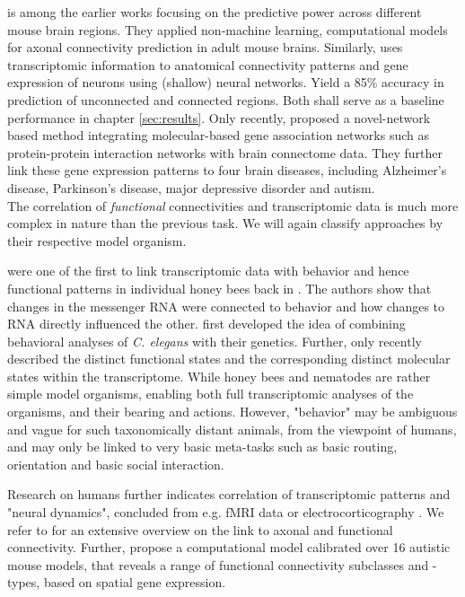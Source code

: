 \documentclass[]{article}
\renewcommand{\cite}{\citep}
\begin{document}
\citet{fakhry2015high} is among the earlier works focusing on the predictive power across different mouse brain regions. They applied non-machine learning, computational models for axonal connectivity prediction in adult mouse brains. Similarly, \citet{roberti2019exploiting} uses transcriptomic information to anatomical connectivity patterns and gene expression of neurons using (shallow) neural networks. Yield a 85\% accuracy in prediction of unconnected and connected regions. Both shall serve as a baseline performance in chapter \ref{sec:results}. 
Only recently, \citet{wang2022network} proposed a novel-network based method integrating molecular-based gene association networks such as protein-protein interaction networks with brain connectome data. They further link these gene expression patterns to four brain diseases, including Alzheimer’s disease, Parkinson’s disease, major depressive disorder and autism.
\\

The correlation of \textit{functional} connectivities and transcriptomic data is much more complex in nature than the previous task. We will again classify approaches by their respective model organism.

\citet{whitfield2003gene} were one of the first to link transcriptomic data with behavior and hence functional patterns in individual honey bees back in \citeyear{whitfield2003gene}. The authors show that changes in the messenger RNA were connected to behavior and how changes to RNA directly influenced the other.
\citet{rankin2002gene} first developed the idea of combining behavioral analyses of \textit{C. elegans} with their genetics. Further, \citet{sun2021temporal} only recently described the distinct functional states and the corresponding distinct molecular states within the transcriptome. While honey bees and nematodes are rather simple model organisms, enabling both full transcriptomic analyses of the organisms, and their bearing and actions. However, "behavior" may be ambiguous and vague for such taxonomically distant animals, from the viewpoint of humans, and may only be linked to very basic meta-tasks such as basic routing, orientation and basic social interaction. 

Research on humans further indicates correlation of transcriptomic patterns and "neural dynamics", concluded from e.g. fMRI data \cite{richiardi2015correlated, diez2018neurogenetic, vertes2016gene} or electrocorticography \cite{betzel2019structural}. We refer to \citet{fulcher2021overcoming} for an extensive overview on the link to axonal and functional connectivity. Further, \citet{Zerbi2021} propose a computational model calibrated over 16 autistic mouse models, that reveals a range of functional connectivity subclasses and -types, based on spatial gene expression.\\
\end{document}
